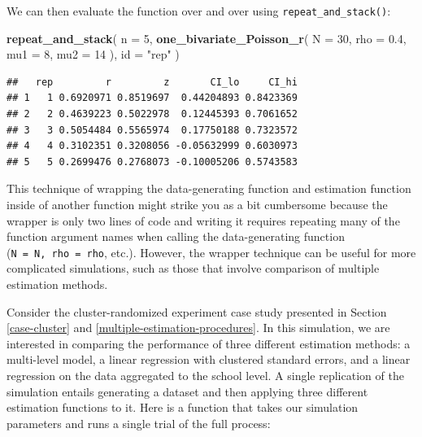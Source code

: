 \documentclass[
]{book}
\newenvironment{Shaded}{\begin{snugshade}}{\end{snugshade}}
\newcommand{\AttributeTok}[1]{\textcolor[rgb]{0.13,0.29,0.53}{#1}}
\newcommand{\DecValTok}[1]{\textcolor[rgb]{0.00,0.00,0.81}{#1}}
\newcommand{\FloatTok}[1]{\textcolor[rgb]{0.00,0.00,0.81}{#1}}
\newcommand{\FunctionTok}[1]{\textcolor[rgb]{0.13,0.29,0.53}{\textbf{#1}}}
\newcommand{\NormalTok}[1]{#1}
\newcommand{\StringTok}[1]{\textcolor[rgb]{0.31,0.60,0.02}{#1}}
\begin{document}
We can then evaluate the function over and over using \texttt{repeat\_and\_stack()}:

\begin{Shaded}
\begin{Highlighting}[]
\FunctionTok{repeat\_and\_stack}\NormalTok{(}
  \AttributeTok{n =} \DecValTok{5}\NormalTok{, }
  \FunctionTok{one\_bivariate\_Poisson\_r}\NormalTok{( }\AttributeTok{N =} \DecValTok{30}\NormalTok{, }\AttributeTok{rho =} \FloatTok{0.4}\NormalTok{, }\AttributeTok{mu1 =} \DecValTok{8}\NormalTok{, }\AttributeTok{mu2 =} \DecValTok{14}\NormalTok{ ), }
  \AttributeTok{id =} \StringTok{"rep"}
\NormalTok{)}
\end{Highlighting}
\end{Shaded}

\begin{verbatim}
##   rep         r         z       CI_lo     CI_hi
## 1   1 0.6920971 0.8519697  0.44204893 0.8423369
## 2   2 0.4639223 0.5022978  0.12445393 0.7061652
## 3   3 0.5054484 0.5565974  0.17750188 0.7323572
## 4   4 0.3102351 0.3208056 -0.05632999 0.6030973
## 5   5 0.2699476 0.2768073 -0.10005206 0.5743583
\end{verbatim}

This technique of wrapping the data-generating function and estimation function inside of another function might strike you as a bit cumbersome because the wrapper is only two lines of code and writing it requires repeating many of the function argument names when calling the data-generating function (\texttt{N\ =\ N,\ rho\ =\ rho}, etc.).
However, the wrapper technique can be useful for more complicated simulations, such as those that involve comparison of multiple estimation methods.

Consider the cluster-randomized experiment case study presented in Section \ref{case-cluster} and \ref{multiple-estimation-procedures}.
In this simulation, we are interested in comparing the performance of three different estimation methods: a multi-level model, a linear regression with clustered standard errors, and a linear regression on the data aggregated to the school level.
A single replication of the simulation entails generating a dataset and then applying three different estimation functions to it.
Here is a function that takes our simulation parameters and runs a single trial of the full process:
\end{document}

